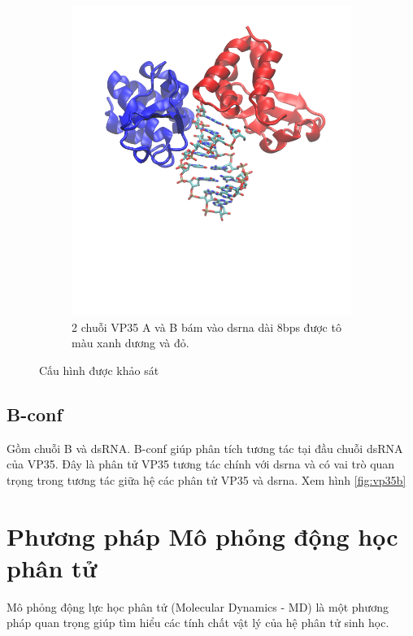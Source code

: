 \documentclass[12pt,a4paper,reqno, oneside]{book}
\begin{document}
\begin{figure}[p]
\begin{subfigure}[h]{0.4\textheight}
		\includegraphics[width=1.0\linewidth,natwidth=610,natheight=642]{VP35_AB.png}
		\vspace{-30pt}
		\caption{2 chuỗi VP35 A và B bám vào \gls{dsrna} dài 8bps được tô màu xanh dương và đỏ.}
		\label{fig:vp35ab}
		\end{subfigure}
		\clearpage

		\caption{Cấu hình được khảo sát}
		\end{figure}
		
	\subsection{B-conf}
	
		Gồm chuỗi B và dsRNA. B-conf giúp phân tích tương tác tại đầu chuỗi dsRNA của VP35. Đây là phân tử VP35 tương tác chính với \gls{dsrna} và có vai trò quan trọng trong tương tác giữa hệ các phân tử VP35 và \gls{dsrna}. Xem hình \ref{fig:vp35b}

\newpage
\section{Phương pháp Mô phỏng động học phân tử}
Mô phỏng động lực học phân tử (Molecular Dynamics - MD) là một phương pháp quan trọng giúp tìm hiểu các tính chất vật lý của hệ phân tử sinh học.
\end{document}

